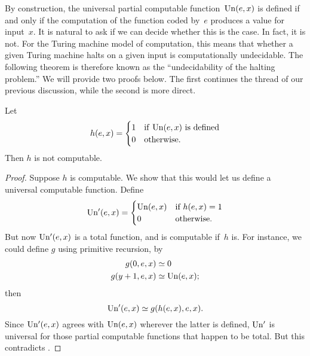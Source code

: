 \documentclass[../../../include/open-logic-section]{subfiles}
\begin{document}

By construction, the universal partial computable
function~$\mathrm{Un}(e,x)$ is defined if and only if the computation of
the function coded by~$e$ produces a value for input~$x$. It is
natural to ask if we can decide whether this is the case. In fact, it
is not. For the Turing machine model of computation, this means that
whether a given Turing machine halts on a given input is
computationally undecidable. The following theorem is therefore known
as the ``undecidability of the halting problem.'' We will provide two
proofs below. The first continues the thread of our previous
discussion, while the second is more direct.

\begin{thm}
Let
\[
h(e, x)  =
\begin{cases}
1 & \text{if\/ $\mathrm{Un}(e, x)$ is defined} \\
0 & \text{otherwise.}
\end{cases}
\]
Then $h$ is not computable.
\end{thm}

\begin{proof}
Suppose $h$ is computable. We show that this would let us define a
universal computable function. Define
\[
\mathrm{Un'}(e,x) =
\begin{cases}
\mathrm{Un}(e,x) & \text{if $h(e,x) = 1$} \\
0 & \text{otherwise.}
\end{cases}
\]
But now $\mathrm{Un'}(e, x)$ is a total function, and is computable if~$h$
is. For instance, we could define $g$ using primitive recursion, by
\begin{align*}
g(0, e, x) & \simeq 0 \\
g(y+1, e, x) & \simeq \mathrm{Un}(e,x);
\end{align*}
then
\[
\mathrm{Un'}(e,x) \simeq g(h(e,x),e,x).
\]
Since $\mathrm{Un'}(e,x)$ agrees with $\mathrm{Un}(e,x)$ wherever the latter
is defined, $\mathrm{Un'}$ is universal for those partial computable
functions that happen to be total. But this contradicts
.
\end{proof}
\end{document}
